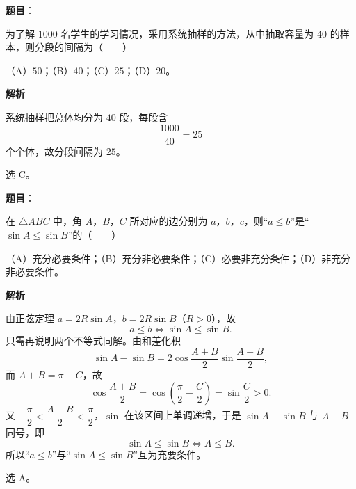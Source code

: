 \begin{answer}

\textbf{题目}：

为了解 $1000$ 名学生的学习情况，采用系统抽样的方法，从中抽取容量为 $40$ 的样本，则分段的间隔为\mbox{（　　）}

（A）$50$；（B）$40$；（C）$25$；（D）$20$。

\textbf{解析}

系统抽样把总体均分为 $40$ 段，每段含
\nopagebreak[4]
\[\frac{1000}{40}=25\]
个个体，故分段间隔为 $25$。

选 C。


\end{answer}
\begin{answer}

\textbf{题目}：

在 $\triangle ABC$ 中，角 $A$，$B$，$C$ 所对应的边分别为 $a$，$b$，$c$，则“$a\leqslant b$”是“$\sin A\leqslant\sin B$”的\mbox{（　　）}

（A）充分必要条件；（B）充分非必要条件；（C）必要非充分条件；（D）非充分非必要条件。

\textbf{解析}

由正弦定理 $a=2R\sin A$，$b=2R\sin B$（$R>0$），故
\nopagebreak[4]
\[a\leqslant b\iff\sin A\leqslant\sin B.\]
只需再说明两个不等式同解。由和差化积
\nopagebreak[4]
\[\sin A-\sin B=2\cos\frac{A+B}{2}\sin\frac{A-B}{2},\]
而 $A+B=\pi-C$，故
\nopagebreak[4]
\[\cos\frac{A+B}{2}=\cos\left(\frac\pi2-\frac C2\right)=\sin\frac C2>0 .\]
又 $-\dfrac\pi2<\dfrac{A-B}{2}<\dfrac\pi2$，$\sin$ 在该区间上单调递增，于是 $\sin A-\sin B$ 与 $A-B$ 同号，即
\nopagebreak[4]
\[\sin A\leqslant\sin B\iff A\leqslant B .\]
所以“$a\leqslant b$”与“$\sin A\leqslant\sin B$”互为充要条件。

选 A。


\end{answer}
